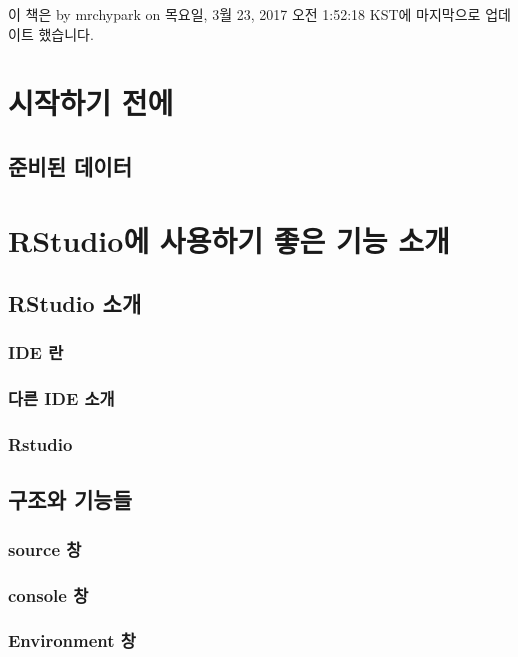 \documentclass[]{book}
\theoremstyle{definition}
\theoremstyle{definition}
\theoremstyle{remark}
\begin{document}
이 책은 by mrchypark on 목요일, 3월 23, 2017 오전 1:52:18 KST에
마지막으로 업데이트 했습니다.

\chapter{시작하기 전에}\label{before-start}

\section{준비된 데이터}\label{data-for-class}

\chapter{RStudio에 사용하기 좋은 기능 소개}\label{rstudio}

\section{RStudio 소개}\label{introduce-rstudio}

\subsection{IDE 란}\label{ide}

\subsection{다른 IDE 소개}\label{ide-others}

\subsection{Rstudio}\label{rstudio}

\section{구조와 기능들}\label{structures}

\subsection{source 창}\label{source-pane}

\subsection{console 창}\label{console-pane}

\subsection{Environment 창}\label{env-pane}
\end{document}
